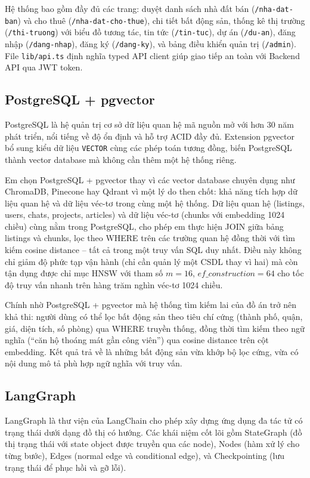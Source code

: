 Hệ thống bao gồm đầy đủ các trang: duyệt danh sách nhà đất bán (\texttt{/nha-dat-ban}) và cho thuê (\texttt{/nha-dat-cho-thue}), chi tiết bất động sản, thống kê thị trường (\texttt{/thi-truong}) với biểu đồ tương tác, tin tức (\texttt{/tin-tuc}), dự án (\texttt{/du-an}), đăng nhập (\texttt{/dang-nhap}), đăng ký (\texttt{/dang-ky}), và bảng điều khiển quản trị (\texttt{/admin}). File \texttt{lib/api.ts} định nghĩa typed API client giúp giao tiếp an toàn với Backend API qua JWT token.

\subsection{PostgreSQL + pgvector}

PostgreSQL là hệ quản trị cơ sở dữ liệu quan hệ mã nguồn mở với hơn 30 năm phát triển, nổi tiếng về độ ổn định và hỗ trợ ACID đầy đủ. Extension pgvector bổ sung kiểu dữ liệu \texttt{VECTOR} cùng các phép toán tương đồng, biến PostgreSQL thành vector database mà không cần thêm một hệ thống riêng.

Em chọn PostgreSQL + pgvector thay vì các vector database chuyên dụng như ChromaDB, Pinecone hay Qdrant vì một lý do then chốt: khả năng tích hợp dữ liệu quan hệ và dữ liệu véc-tơ trong cùng một hệ thống. Dữ liệu quan hệ (listings, users, chats, projects, articles) và dữ liệu véc-tơ (chunks với embedding 1024 chiều) cùng nằm trong PostgreSQL, cho phép em thực hiện JOIN giữa bảng listings và chunks, lọc theo WHERE trên các trường quan hệ đồng thời với tìm kiếm cosine distance -- tất cả trong một truy vấn SQL duy nhất. Điều này không chỉ giảm độ phức tạp vận hành (chỉ cần quản lý một CSDL thay vì hai) mà còn tận dụng được chỉ mục HNSW với tham số $m=16$, $ef\_construction=64$ cho tốc độ truy vấn nhanh trên hàng trăm nghìn véc-tơ 1024 chiều.

Chính nhờ PostgreSQL + pgvector mà hệ thống tìm kiếm lai của đồ án trở nên khả thi: người dùng có thể lọc bất động sản theo tiêu chí cứng (thành phố, quận, giá, diện tích, số phòng) qua WHERE truyền thống, đồng thời tìm kiếm theo ngữ nghĩa (``căn hộ thoáng mát gần công viên'') qua cosine distance trên cột embedding. Kết quả trả về là những bất động sản vừa khớp bộ lọc cứng, vừa có nội dung mô tả phù hợp ngữ nghĩa với truy vấn.

\subsection{LangGraph}

LangGraph là thư viện của LangChain cho phép xây dựng ứng dụng đa tác tử có trạng thái dưới dạng đồ thị có hướng. Các khái niệm cốt lõi gồm StateGraph (đồ thị trạng thái với state object được truyền qua các node), Nodes (hàm xử lý cho từng bước), Edges (normal edge và conditional edge), và Checkpointing (lưu trạng thái để phục hồi và gỡ lỗi).

